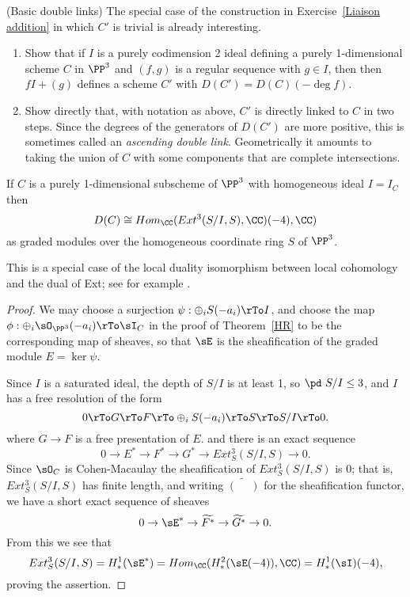 \begin{exercise}(Basic double links)\label{Basic double links}
The special case of the construction in Exercise~\ref{Liaison addition} in which $C'$ is trivial is already interesting. 

\begin{enumerate}
 \item Show that if $I$ is a purely codimension 2 ideal
 defining a purely 1-dimensional scheme $C$ in $\PP^3$
 and $(f, g)$ is a regular sequence with $g\in I$, then
 then  $fI+(g)$ defines a scheme $C'$ with $D(C') = D(C)(-\deg f)$.

 \item Show directly that, with notation as above, $C'$ is directly linked to $C$
 in two steps.  Since the degrees of the generators of $D(C')$ are more positive, this
 is sometimes called an \emph{ascending double link}. Geometrically it amounts to taking the
 union of $C$ with some  components that are complete intersections.
 \end{enumerate}

\end{exercise}


\begin{corollary}
If $C$ is a purely 1-dimensional subscheme of $\PP^3$ with homogeneous ideal $I = I_C$ then 
$$
D(C) \cong Hom_\CC (Ext^3(S/I, S), \CC)(-4), \CC)
$$
as graded modules over the homogeneous coordinate ring $S$ of $\PP^3$.
\end{corollary}

This is a special case of the local duality isomorphism between local cohomology and the dual of Ext; see for example \cite[Theorem A.1.9]{MR2103875}.
\begin{proof}
We may choose a surjection  $\psi:  \oplus_iS(-a_i)\rTo I$, and choose the map
$\phi: \oplus_i\sO_{\PP^3}(-a_i)\rTo\sI_C$
in the proof of Theorem~\ref{HR}
to be the corresponding map of sheaves, so that
$\sE$ is the sheafification of the graded module $E = \ker \psi$.

Since $I$ is a saturated ideal,
 the depth of $S/I$ is at least 1, so $\pd\ S/I\leq 3$, and $I$ has a free resolution of the form
$$
0\rTo G \rTo F \rTo \oplus_iS(-a_i)  \rTo S\rTo S/I \rTo 0.
$$
where $G\to F$ is a free presentation of $E$. and there is an exact sequence
$$
0 \to E^* \to F^* \to G^* \to Ext^3_S(S/I, S) \to 0.
$$
Since $\sO_C$ is Cohen-Macaulay the sheafification of $Ext^3_S(S/I, S)$ is 0; that is,
$Ext^3_S(S/I, S)$ has finite length, and writing $\widetilde{(\phantom{-})}$ for the sheafification functor,
we have a short exact sequence of sheaves 
$$
0\to \sE^* \to \widetilde{F^*} \to \widetilde{G^*}\to 0.
$$
From this we see that 
$$
Ext^3_S(S/I,S) = H^1_*(\sE^*) = Hom_\CC( H^2_*(\sE(-4)),\CC) = H^1_*(\sI)(-4),
$$
proving the assertion.
\end{proof}
